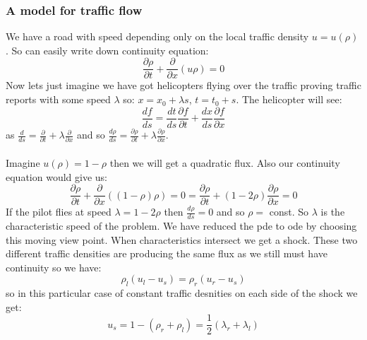 \documentclass{article}
\begin{document}
      \subsubsection{A model for traffic flow}
      We have a road with speed depending only on the local traffic density $u = u(\rho)$. So can easily write down continuity equation:
      $$
       \frac{\partial \rho}{\partial t} + \frac{\partial}{\partial x} (u \rho) = 0
      $$
Now lets just imagine we have got helicopters flying over the traffic proving traffic reports with some speed $\lambda$ so:
$x = x_0 + \lambda s$, $t = t_0 + s$. The helicopter will see:
$$
 \frac{df}{ds} = \frac{dt}{ds} \frac{\partial f}{\partial t} + \frac{dx}{ds} \frac{\partial f}{\partial x}
$$
as $ \frac{d}{ds} = \frac{\partial}{\partial t} + \lambda \frac{\partial }{\partial x}$ and so $\frac{d \rho}{ds} = \frac{\partial \rho}{\partial t} +\lambda \frac{\partial \rho}{\partial x}$.\\\\
Imagine $u(\rho) = 1 -\rho$ then we will get a quadratic flux. Also our continuity equation would give us:
$$
\frac{\partial \rho}{\partial t} + \frac{\partial}{\partial x} ( (1- \rho) \rho) = 0 = \frac{\partial \rho}{\partial t} + ( 1- 2 \rho) \frac{\partial \rho}{\partial x} = 0
$$
If the pilot flies at speed $\lambda = 1- 2 \rho$ then $\frac{d \rho}{ds} =0$ and so $\rho =$ const. So $\lambda $ is the characteristic speed of the problem. We have reduced the pde to ode by choosing this moving view point. When characteristics intersect we get a shock. These two different traffic densities are producing the same flux as we still must have continuity so we have:
$$
 \rho_l ( u_l - u_s) = \rho_r( u_r - u_s)
$$
 so in this particular case of constant traffic desnities on each side of the shock we get:
 $$
 u_s = 1 - (\rho_r + \rho_l) = \frac{1}{2} (\lambda_r + \lambda_l)
 $$
\end{document}
